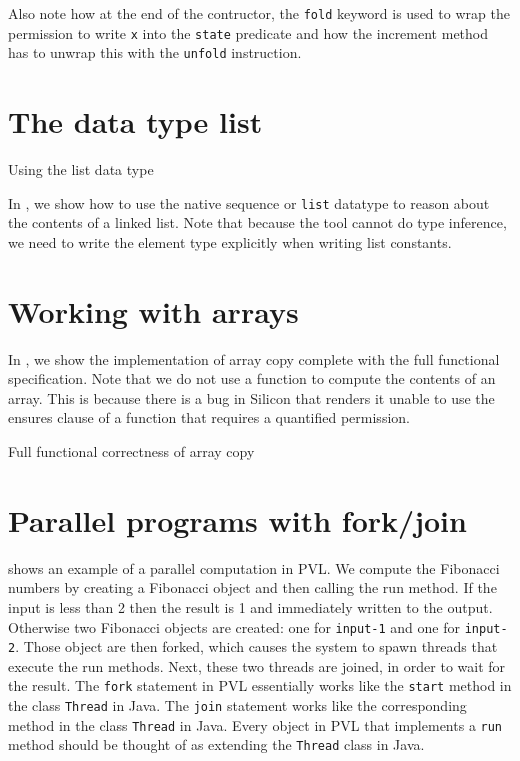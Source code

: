 Also note how at the end of the contructor,
the \lstinline+fold+ keyword is used to wrap the permission
to write \lstinline+x+ into the \lstinline+state+ predicate and how the increment
method has to unwrap this with the \lstinline+unfold+ instruction.

\section{The data type list}\label{sec:list}
\label{list examples}

\begin{listing}

\caption{Using the list data type}
\label{list}
\end{listing}

In , we show how to use the native sequence or \lstinline+list+ datatype
to reason about the contents of a linked list. Note that because the tool
cannot do type inference, we need to write the element type explicitly
when writing list constants.


\section{Working with arrays}\label{sec:arrays}

In , we show the implementation of array copy complete with the full functional specification.
Note that we do not use a function to compute the contents of an array. This is because
there is a bug in Silicon that renders it unable to use the ensures clause of a function
that requires a quantified permission.

\begin{listing}

\caption{Full functional correctness of array copy}
\label{array copy}
\end{listing}

\section{Parallel programs with fork/join}\label{sec:forkjoin}


 shows an example of a parallel computation
in PVL. We compute the Fibonacci numbers by creating a Fibonacci object
and then calling the run method. If the input is less than 2 then the result is
1 and immediately written to the output. Otherwise two Fibonacci objects are created: one for \lstinline+input-1+ and
one for \lstinline+input-2+. Those object are then forked, which causes the system
to spawn threads that execute the run methods. Next, these two threads are joined, in order to wait for the result.
The \lstinline+fork+ statement in PVL essentially works like the \lstinline+start+ method in the
class \lstinline+Thread+ in Java. The \lstinline+join+ statement works like the corresponding
method in the class \lstinline+Thread+ in Java. Every object in PVL that implements a \lstinline+run+ method
should be thought of as extending the \lstinline+Thread+ class in Java.

